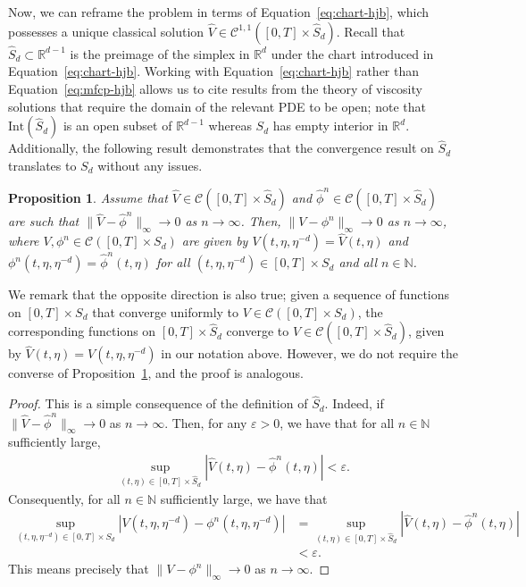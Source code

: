 \documentclass[11pt,reqno]{amsart}
\numberwithin{equation}{section}
\theoremstyle{plain}
\newtheorem{proposition}[theorem]{Proposition}
\newcommand{\R}{\mathbb{R}}
\newcommand{\sC}{\mathcal{C}}
\newcommand{\N}{\mathbb{N}}
\newcommand{\intr}{\text{Int}}
\begin{document}
Now, we can reframe the problem in terms of Equation~\eqref{eq:chart-hjb}, which possesses a unique classical solution $\widehat{V} \in \sC^{1,1}([0, T] \times \widehat{S}_d)$. Recall that $\widehat{S}_d \subset \R^{d-1}$ is the preimage of the simplex in $\R^d$ under the chart introduced in Equation~\eqref{eq:chart-hjb}. Working with Equation~\eqref{eq:chart-hjb} rather than Equation~\eqref{eq:mfcp-hjb} allows us to cite results from the theory of viscosity solutions that require the domain of the relevant PDE to be open; note that $\intr(\widehat{S}_d)$ is an open subset of $\R^{d-1}$ whereas $S_d$ has empty interior in $\R^d$. Additionally, the following result demonstrates that the convergence result on $\widehat{S}_d$ translates to $S_d$ without any issues.
\begin{proposition}
\label{prop:eps-n-convergence}
Assume that $\widehat{V} \in \sC([0,T] \times \widehat{S}_d)$ and $\widehat{\phi}^n \in \sC([0,T] \times \widehat{S}_d)$ are such that $\|\widehat{V} - \widehat{\phi}^n\|_\infty \to 0$ as $n \to \infty$. Then, $\|V - \phi^n\|_\infty \to 0$ as $n \to \infty$, where $V, \phi^n \in \sC([0,T] \times S_d)$ are given by $V(t, \eta, \eta^{-d}) = \widehat{V}(t, \eta)$ and $\phi^n(t, \eta, \eta^{-d}) = \widehat{\phi}^n(t, \eta)$ for all $(t, \eta, \eta^{-d}) \in [0,T] \times S_d$ and all $n \in \N$.
\end{proposition}
We remark that the opposite direction is also true; given a sequence of functions on $[0, T] \times S_d$ that converge uniformly to $V \in \mathcal{C}([0, T] \times S_d)$, the corresponding functions on $[0, T] \times \widehat{S}_d$ converge to $\widehat{V} \in \mathcal{C}([0, T] \times \widehat{S}_d)$, given by $\widehat{V}(t, \eta) = V(t, \eta, \eta^{-d})$ in our notation above. However, we do not require the converse of Proposition~\ref{prop:eps-n-convergence}, and the proof is analogous.
\begin{proof}
This is a simple consequence of the definition of $\widehat{S}_d$. Indeed, if $\|\widehat{V} - \widehat{\phi}^n\|_\infty \to 0$ as $n \to \infty$. Then, for any $\varepsilon > 0$, we have that for all $n \in \N$ sufficiently large,
\begin{align*}
    \sup_{(t,\eta) \in [0,T] \times \widehat{S}_d} |\widehat{V}(t, \eta) - \widehat{\phi}^n(t, \eta)| < \varepsilon.
\end{align*}
Consequently, for all $n \in \N$ sufficiently large, we have that
\begin{align*}
    \sup_{(t, \eta, \eta^{-d}) \in [0,T] \times S_d} |V(t,\eta, \eta^{-d}) - \phi^n(t,\eta, \eta^{-d})| &= \sup_{(t,\eta) \in [0,T] \times \widehat{S}_d} |\widehat{V}(t,\eta) - \widehat{\phi}^n(t,\eta)| \\
    &< \varepsilon.
\end{align*}
This means precisely that $\|V - \phi^n\|_\infty \to 0$ as $n \to \infty$.
\end{proof}
\end{document}
